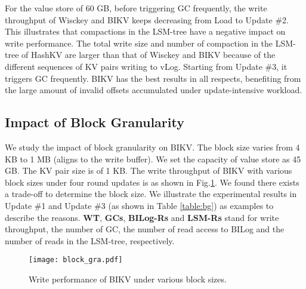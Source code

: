 \documentclass[sigconf]{acmart}
\begin{document}
For the value store of 60 GB, before triggering GC frequently, the write throughput of Wisckey and BIKV keeps decreasing from Load to Update \#2. This illustrates that compactions in the LSM-tree have a negative impact on write performance. The total write size and number of compaction in the LSM-tree of HashKV are larger than that of Wisckey and BIKV because of the different sequences of KV pairs writing to vLog. Starting from Update \#3, it triggers GC frequently. BIKV has the best results in all respects, benefiting from the large amount of invalid offsets accumulated under update-intensive workload.


\subsection{Impact of Block Granularity}
We study the impact of block granularity on BIKV. The block size varies from 4 KB to 1 MB (aligns to the write buffer). We set the capacity of value store as 45 GB. The KV pair size is of 1 KB. The write throughput of BIKV with various block sizes under four round updates is as shown in Fig.\ref{fig:bg}. We found there exists a trade-off to determine the block size. We illustrate the experimental results in Update \#1 and Update \#3 (as shown in Table \ref{table:bg}) as examples to describe the reasons. \textbf{WT}, \textbf{GCs}, \textbf{BILog-Rs} and \textbf{LSM-Rs} stand for write throughput, the number of GC, the number of read access to BILog and the number of reads in the LSM-tree, respectively.

\begin{figure}[t]
	\setlength{\abovecaptionskip}{0.cm}	
	\setlength{\belowcaptionskip}{-0.cm}
	\centering
	\texttt{[image: block\_gra.pdf]}
	\makeatletter\def\@captype{figure}\makeatother\caption{Write performance of BIKV under various block sizes.} 
	\label{fig:bg}			
\end{figure}
\end{document}
